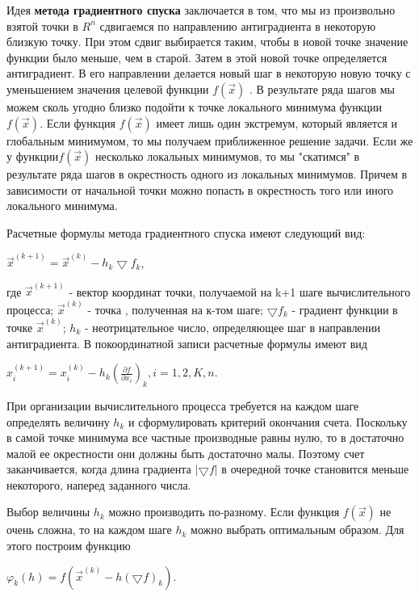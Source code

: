 {Идея \textbf{метода градиентного спуска} заключается в том, что мы из произвольно взятой точки в $R^{n}$ сдвигаемся по направлению антиградиента в некоторую  близкую точку.  При этом сдвиг выбирается таким, чтобы в новой точке значение функции было меньше, чем в старой. Затем в этой новой точке определяется антиградиент. В его направлении делается новый шаг в некоторую новую точку с уменьшением значения целевой функции $f(\vec{x})$ . В результате ряда шагов мы можем сколь угодно близко подойти к точке локального минимума функции $f(\vec{x})$. Если функция $f(\vec{x})$ имеет лишь один экстремум,  который является и глобальным минимумом,  то мы получаем приближенное решение задачи. Если же у функции$f(\vec{x})$ несколько локальных минимумов,  то мы "скатимся" в результате ряда шагов в окрестность одного из локальных минимумов. Причем в зависимости от начальной точки можно попасть в окрестность того или иного локального минимума.

Расчетные формулы метода градиентного спуска имеют следующий вид:
\begin{center}
	$\vec{x}^{(k+1)} = \vec{x}^{(k)}-h_{k} \bigtriangledown f_{k}$,
\end{center}
где $\vec{x}^{(k+1)}$ - вектор координат точки, получаемой на  k+1 шаге вычислительного процесса; $\vec{x}^{(k)}$ - точка , полученная на к-том шаге; $\bigtriangledown f_{k}$ - градиент функции в точке  $\vec{x}^{(k)}$; $h_{k}$ - неотрицательное число, определяющее шаг в направлении антиградиента. В покоординатной записи расчетные формулы имеют вид
\begin{center}
	$x_{i}^{(k+1)}=x_{i}^{(k)}-h_{k}\left (\frac{\partial f}{\partial x_{i}}  \right )_{k}, i = 1, 2, K, n.$
\end{center}

При организации вычислительного процесса требуется на каждом шаге определять величину $h_{k}$ и сформулировать критерий окончания счета. Поскольку в самой точке минимума все частные производные равны нулю, то  в  достаточно  малой ее окрестности они должны быть достаточно малы. Поэтому счет заканчивается, когда длина градиента $\left |\bigtriangledown f  \right |$ в очередной точке становится меньше некоторого, наперед заданного числа.

Выбор величины  $h_{k}$ можно производить по-разному. Если функция $f(\vec{x})$ не очень сложна,  то на каждом шаге $h_{k}$ можно выбрать оптимальным образом. Для этого построим функцию
\begin{center}
	$\varphi_{k}(h)=f(\vec{x}^{(k)}-h(\bigtriangledown f)_{k}).$
\end{center}

}
